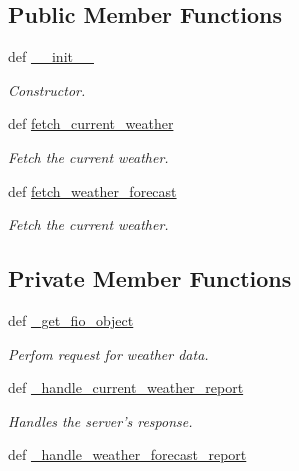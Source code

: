 \subsection*{Public Member Functions}
\begin{DoxyCompactItemize}
\item 
def \hyperlink{classrapp__weather__reporter_1_1forecastio__reporter_1_1ForecastIOReporter_ad1d7f86fdcf99250bc82c4f29e459b92}{\-\_\-\-\_\-init\-\_\-\-\_\-}
\begin{DoxyCompactList}\small\item\em Constructor. \end{DoxyCompactList}\item 
def \hyperlink{classrapp__weather__reporter_1_1forecastio__reporter_1_1ForecastIOReporter_a00d1ef9cdb36f89e7fb127ece047ed88}{fetch\-\_\-current\-\_\-weather}
\begin{DoxyCompactList}\small\item\em Fetch the current weather. \end{DoxyCompactList}\item 
def \hyperlink{classrapp__weather__reporter_1_1forecastio__reporter_1_1ForecastIOReporter_ad07e812b554a321835b231136585e672}{fetch\-\_\-weather\-\_\-forecast}
\begin{DoxyCompactList}\small\item\em Fetch the current weather. \end{DoxyCompactList}\end{DoxyCompactItemize}
\subsection*{Private Member Functions}
\begin{DoxyCompactItemize}
\item 
def \hyperlink{classrapp__weather__reporter_1_1forecastio__reporter_1_1ForecastIOReporter_a8ceabf4cfdcf26219faa493460df1ff8}{\-\_\-get\-\_\-fio\-\_\-object}
\begin{DoxyCompactList}\small\item\em Perfom request for weather data. \end{DoxyCompactList}\item 
def \hyperlink{classrapp__weather__reporter_1_1forecastio__reporter_1_1ForecastIOReporter_ab8581ac6e4f4e5b2c2925ce59b069257}{\-\_\-handle\-\_\-current\-\_\-weather\-\_\-report}
\begin{DoxyCompactList}\small\item\em Handles the server's response. \end{DoxyCompactList}\item 
def \hyperlink{classrapp__weather__reporter_1_1forecastio__reporter_1_1ForecastIOReporter_a7c8cf7b7f455e7f7c0fde59f3e3f4a8e}{\-\_\-handle\-\_\-weather\-\_\-forecast\-\_\-report}
\end{DoxyCompactItemize}
